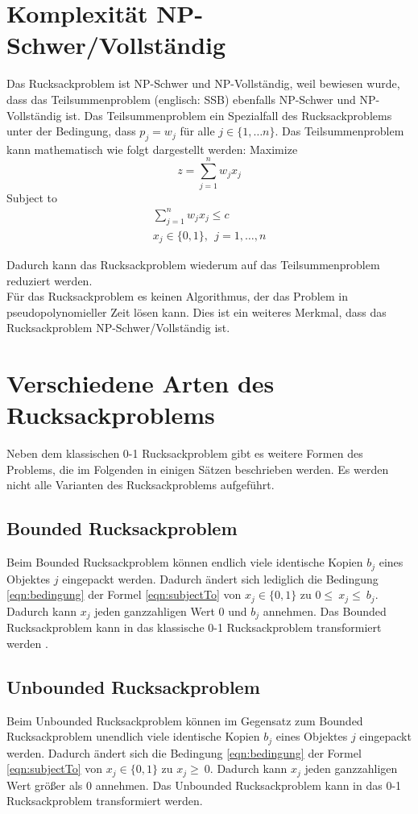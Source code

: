 \section{Komplexität NP-Schwer/Vollständig}
Das Rucksackproblem ist NP-Schwer und NP-Vollständig, weil bewiesen wurde, dass das Teilsummenproblem (englisch: \ac{SSB}) ebenfalls NP-Schwer und NP-Vollständig ist. 
Das Teilsummenproblem ein Spezialfall des Rucksackproblems unter der Bedingung, dass $p_j=w_j$ für alle $j \in \{1, \dots n\}$.
Das Teilsummenproblem kann mathematisch wie folgt dargestellt werden: \cite[vgl.][]{Martello1987}
\newpage
Maximize
\begin{equation}
z=\sum_{j=1}^{n}{w_jx_j} 
\end{equation}
Subject to 
\begin{eqnarray}
\sum_{j=1}^{n}{w_jx_j\le c}\\
x_j\in\{0,1\},\ \ j=1,\ldots,n
\end{eqnarray}


Dadurch kann das Rucksackproblem wiederum auf das Teilsummenproblem reduziert werden. 
\\
Für das Rucksackproblem es keinen Algorithmus, der das Problem in pseudopolynomieller Zeit lösen kann.
Dies ist ein weiteres Merkmal, dass das Rucksackproblem NP-Schwer/Vollständig ist.

\section{Verschiedene Arten des Rucksackproblems}
Neben dem klassischen 0-1 Rucksackproblem gibt es weitere Formen des Problems, die im Folgenden in einigen Sätzen beschrieben werden. Es werden nicht alle Varianten des Rucksackproblems aufgeführt. 
\subsection{Bounded Rucksackproblem}
Beim Bounded Rucksackproblem können endlich viele identische Kopien $b_j$ eines Objektes $j$ eingepackt werden. Dadurch ändert sich lediglich die Bedingung \ref{eqn:bedingung} der Formel \ref{eqn:subjectTo} von $x_j\in\{0,1\}$ zu $0\le\ x_j\le\ b_j$. Dadurch kann $x_j$ jeden ganzzahligen Wert $0$ und $b_j$ annehmen. \cite[vgl.][]{Martello1990} Das Bounded Rucksackproblem kann in das klassische 0-1 Rucksackproblem transformiert werden \cite[vgl.][]{Schury2013}.
\subsection{Unbounded Rucksackproblem}
Beim Unbounded Rucksackproblem können im Gegensatz zum Bounded Rucksackproblem unendlich viele identische Kopien $b_j$ eines Objektes $j$ eingepackt werden. Dadurch ändert sich die Bedingung \ref{eqn:bedingung} der Formel \ref{eqn:subjectTo} von $x_j\in\{0,1\}$ zu $x_j\geq\ 0$. Dadurch kann $x_j$ jeden ganzzahligen Wert größer als $0$ annehmen. Das Unbounded Rucksackproblem kann in das 0-1 Rucksackproblem transformiert werden. \cite[vgl.][]{Schury2013}
